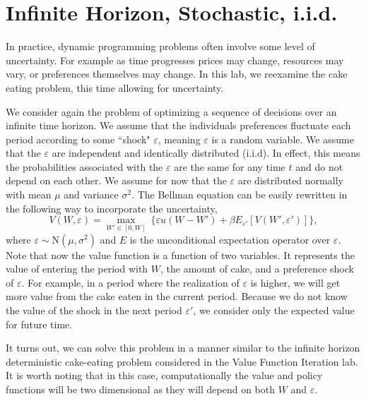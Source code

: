 \newcommand\ve{\varepsilon}


\section*{Infinite Horizon, Stochastic, i.i.d.}\label{SecRecProbInfinHorStochiid}

In practice, dynamic programming problems often involve some level of uncertainty.
For example as time progresses prices may change, resources may vary, or preferences themselves may change.
 In this lab, we reexamine the cake eating problem, this time allowing for uncertainty.

We consider again the problem of optimizing a sequence of decisions over an infinite time horizon.
We assume that the individuals preferences fluctuate each period according to some ``shock" $\ve$,
meaning $\ve$ is a random variable.  We assume that the $\ve$ are independent and identically
distributed (i.i.d).  In effect, this means the probabilities associated with the $\ve$ are the
same for any time $t$ and do not depend on each other.  We assume for now that the $\ve$ are
distributed normally with mean $\mu$ and variance $\sigma^2$.  The Bellman equation can be easily
rewritten in the following way to incorporate the uncertainty,
\begin{equation}\label{stoch_Bellman}
   V\left(W,\ve\right) = \max_{W'\in[0,W]}\: \{\ve u\left(W - W'\right) + 
   \beta E_{\ve'}\left[V\left(W',\ve'\right)\right]\}, 
\end{equation}
where $\ve \sim \text{N}(\mu,\sigma^2)$ and
$E$ is the unconditional expectation operator over $\ve$.  Note that now the value function is a 
function of two variables.  It represents the value of entering the period with $W$, the amount of cake, 
and a preference shock of $\ve$.  For example, in a period where the realization of $\ve$ is higher, 
we will get more value from the cake eaten in the current period.  Because we do not know the value of 
the shock in the next period $\ve'$, we consider only the expected value for future time.

It turns out, we can solve this problem in a manner similar to the infinite horizon deterministic cake-eating 
problem considered in the Value Function Iteration lab.  It is worth noting that in this case, computationally
 the value and policy functions will be two dimensional as they will depend on both $W$ and $\ve$.

